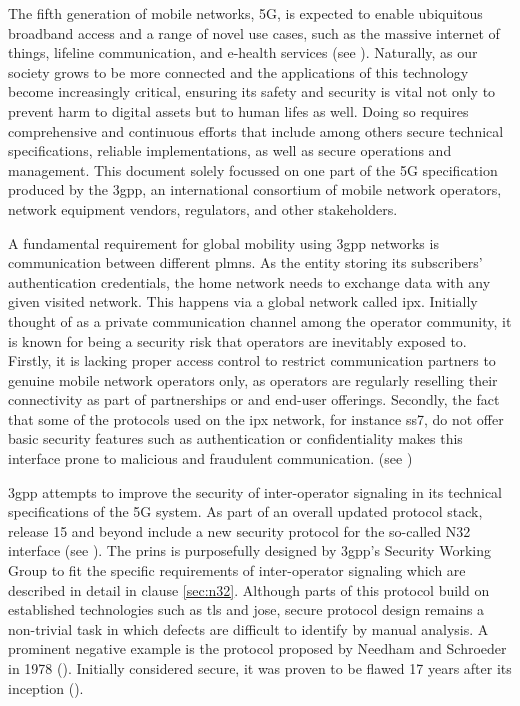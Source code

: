 The fifth generation of mobile networks, 5G, is expected to enable ubiquitous broadband access and a range of novel use cases, such as the massive internet of things, lifeline communication, and e-health services (see \cite{ngmn5Gwhite}).
Naturally, as our society grows to be more connected and the applications of this technology become increasingly critical, ensuring its safety and security is vital not only to prevent harm to digital assets but to human lifes as well.
Doing so requires comprehensive and continuous efforts that include among others secure technical specifications, reliable implementations, as well as secure operations and management.
This document solely focussed on one part of the 5G specification produced by the \gls{3gpp}, an international consortium of mobile network operators, network equipment vendors, regulators, and other stakeholders.

A fundamental requirement for global mobility using \gls{3gpp} networks is communication between different \glspl{plmn}.
As the entity storing its subscribers' authentication credentials, the home network needs to exchange data with any given visited network. This happens via a global network called \gls{ipx}.
Initially thought of as a private communication channel among the operator community, it is known for being a security risk that operators are inevitably exposed to.
Firstly, it is lacking proper access control to restrict communication partners to genuine mobile network operators only, as operators are regularly reselling their connectivity as part of partnerships or and end-user offerings.
Secondly, the fact that some of the protocols used on the \gls{ipx} network, for instance \gls{ss7}, do not offer basic security features such as authentication or confidentiality makes this interface prone to malicious and fraudulent communication. (see \cite{sahin2017sok})

\gls{3gpp} attempts to improve the security of inter-operator signaling in its technical specifications of the 5G system.
As part of an overall updated protocol stack, release 15 and beyond include a new security protocol for the so-called N32 interface (see \cite{3gpp.33.501}).
The \gls{prins} is purposefully designed by \gls{3gpp}'s Security Working Group to fit the specific requirements of inter-operator signaling which are described in detail in clause \ref{sec:n32}.
Although parts of this protocol build on established technologies such as \gls{tls} and \gls{jose}, secure protocol design remains a non-trivial task in which defects are difficult to identify by manual analysis.
A prominent negative example is the protocol proposed by Needham and Schroeder in 1978 (\cite{needham1978using}).
Initially considered secure, it was proven to be flawed 17 years after its inception (\cite{lowe1996breaking}).

